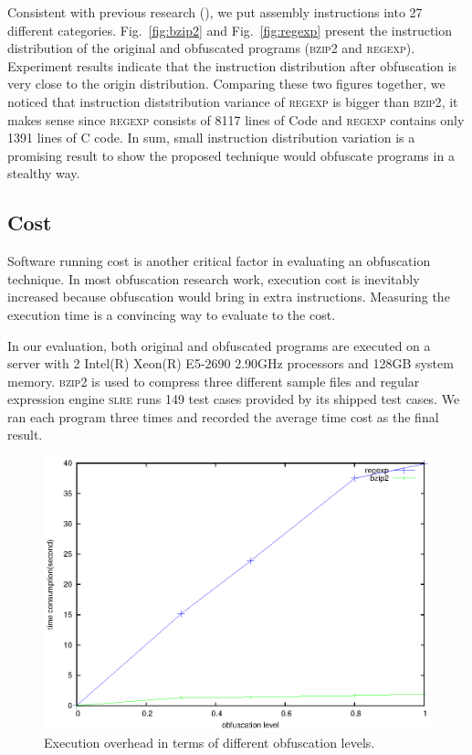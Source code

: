 \documentclass[lnicst]{svmultln}
\newcommand{\F}{Fig.}
\begin{document}
Consistent with previous research (\cite{Trans}), we put assembly instructions
into 27 different categories. \F~\ref{fig:bzip2} and \F~\ref{fig:regexp} present
the instruction distribution of the original and obfuscated programs
(\textsc{bzip2} and \textsc{regexp}). Experiment results indicate that the
instruction distribution after obfuscation is very close to the origin
distribution. Comparing these two figures together, we noticed that instruction
diststribution variance of \textsc{regexp} is bigger than \textsc{bzip2}, it makes sense
since \textsc{regexp} consists of 8117 lines of Code and \textsc{regexp} contains only 1391 lines
of C code. In sum,
small instruction distribution variation is a promising result to show the
proposed technique would obfuscate programs in a stealthy way.

\subsection{Cost}
Software running cost is another critical factor in evaluating an obfuscation
technique. In most obfuscation research work, execution cost is inevitably
increased because obfuscation would bring in extra instructions. Measuring the
execution time is a convincing way to evaluate to the cost.

In our evaluation, both original and obfuscated programs are executed on a
server with 2 Intel(R) Xeon(R) E5-2690 2.90GHz processors and 128GB system
memory. \textsc{bzip2} is used to compress three different sample files and
regular expression engine \textsc{slre} runs 149 test cases provided by its
shipped test cases. We ran each program three times and recorded the average
time cost as the final result.

\begin{figure}
  \includegraphics[width=0.9\linewidth]{cost.eps}
  \caption{Execution overhead in terms of different obfuscation levels.}
  \label{fig:cost}
\end{figure}
\end{document}
